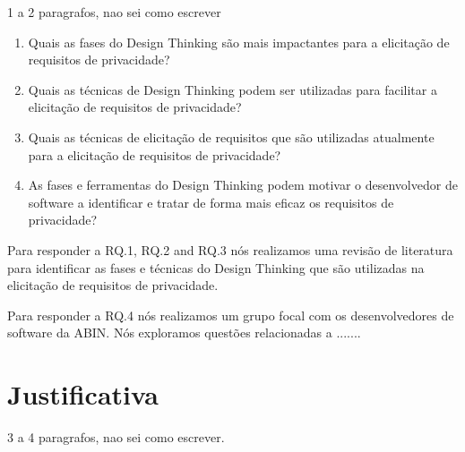 1 a 2 paragrafos, nao sei como escrever


\begin{enumerate}[RQ.1:]

\item Quais as fases do Design Thinking são mais impactantes para a elicitação de requisitos de privacidade?

\item Quais as técnicas de Design Thinking podem ser utilizadas para facilitar a elicitação de requisitos de privacidade?

\item Quais as técnicas de elicitação de requisitos que são utilizadas atualmente para a elicitação de requisitos de privacidade?

\item As fases e ferramentas do Design Thinking podem motivar o desenvolvedor de software a identificar e tratar de forma mais eficaz os requisitos de privacidade?

\end{enumerate}

Para responder a RQ.1, RQ.2 and RQ.3 nós realizamos uma revisão de literatura para identificar as fases e técnicas do Design Thinking que são utilizadas na elicitação de requisitos de privacidade.

Para responder a RQ.4 nós realizamos um grupo focal com os desenvolvedores de software da ABIN. Nós exploramos questões relacionadas a .......


\section{Justificativa}%

3 a 4 paragrafos, nao sei como escrever. 


